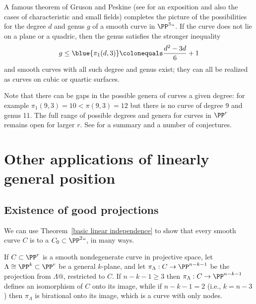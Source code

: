 \begin{fact}
A famous theorem of Gruson and Peskine \citeyear{MR0690647} (see
%
%
\cite{MR0689536} for an exposition and also the cases of
characteristic and small fields) completes the picture of the
possibilities for the degree $d$ and  genus $g$  of a smooth curve in
$\PP^3` `$. If the curve does not lie on a plane or a quadric, then the
genus satisfies the stronger inequality
$$
g\leq 
\blue{\pi_1(d,3)}
\colonequals  \frac{d^2-3d}{6} +1
$$
and smooth curves with all such degree and genus exist; they can all be
%
realized as curves
on cubic or quartic surfaces.

Note that there can be gaps in the possible genera of curves a given
degree: for example  $\pi_1(9,3) = 10<\pi(9,3) =12$ but there is
no curve of degree 9 and genus 11.
The full range of possible degrees and genera for curves in $\PP^r$
remains open for larger $r$.
See 
\cite{MR0589222} for a summary and a number of
conjectures.
\end{fact}


\section{Other applications of linearly general position}
\label{projection section}\label{good projections}

\subsection*{Existence of good projections}

We can use Theorem~\ref{basic linear independence} to show that every
%
smooth curve $C$ is 
%
%
to a 
$C_0 \subset \PP^2``$, in many ways.

\begin{proposition}\label{nodal projection}
If $C \subset \PP^r$ is a smooth nondegenerate curve in projective space,
let $\Lambda \cong \PP^{k} \subset \PP^r$ be a general $k$-plane, and let
$\pi_\Lambda : C \to \PP^{n-k-1}$ be the projection from $\Lambda@$,
restricted to $C$. If  $n-k-1 \geq 3$
then
$\pi_\Lambda: C \to \PP^{n-k-1}$ defines an isomorphism of $C$ onto
its image, while if $n-k-1 = 2$ (i.e., $k = n- 3$) then $\pi_\Lambda$
is birational onto its image, which is a curve with only nodes.
\end{proposition}

